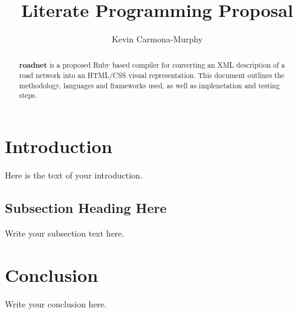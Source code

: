 \documentclass{article}
\begin{document}
\title{Literate Programming Proposal}
\author{Kevin Carmona-Murphy}

\maketitle

\begin{abstract}
\textbf{roadnet} is a proposed Ruby based compiler for converting an XML description of a road network into an HTML/CSS visual representation. This document outlines the methodology, languages and frameworks used, as well as implenetation and testing steps.
\end{abstract}

\section{Introduction}
Here is the text of your introduction.

\subsection{Subsection Heading Here}
Write your subsection text here.

\section{Conclusion}
Write your conclusion here.
\end{document}
